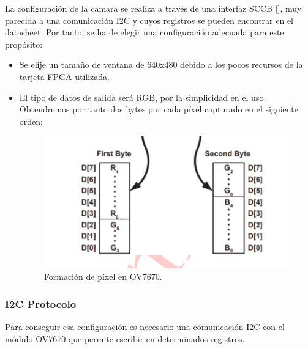 La configuración de la cámara se realiza a través de una interfaz SCCB [], muy parecida a una comunicación I2C y cuyos registros se pueden encontrar en el datasheet. Por tanto, se ha de elegir una configuración adecuada para este propósito:

\begin{itemize}
	\item Se elije un tamaño de ventana de 640x480 debido a los pocos recursos de la tarjeta FPGA utilizada.
	\item El tipo de datos de salida será RGB, por la simplicidad en el uso. Obtendremos por tanto dos bytes por cada píxel capturado en el siguiente orden: 
	
		\begin{figure}[H]
			\center
			\includegraphics[trim = 0mm 0.5cm 0mm 0.5cm, clip,scale=0.6]{imagenes/Cuadricoptero_vision/pixel_OV7670}
			\caption{Formación de píxel en OV7670.}
			\label{fig:pixel_OV7670}
		\end{figure}
	
\end{itemize}

\subsubsection{I2C Protocolo}

Para conseguir esa configuración es necesario una comunicación I2C con el módulo OV7670 que permite escribir en determinados registros.

